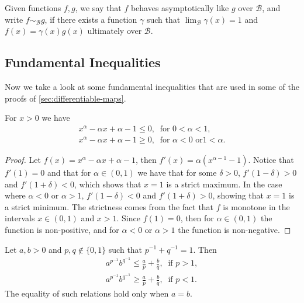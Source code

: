 \begin{definition}
Given functions \(f, g\), we say that \(f\) behaves asymptotically like \(g\)
over \(\mathcal B\), and write \(f \sim_{\mathcal B} g\), if there exists a
function \(\gamma\) such that \(\lim_{\mathcal B} \gamma(x) = 1\) and \(f(x) =
\gamma(x) g(x)\) ultimately over \(\mathcal B\).
\end{definition}

\subsection{Fundamental Inequalities}

Now we take a look at some fundamental inequalities that are used in some of the
proofs of \cref{sec:differentiable-maps}.

\begin{lemma}\label{lem: CI}
For \(x > 0\) we have
\begin{gather}
\label{eq: CI-1}
x^\alpha - \alpha x + \alpha - 1 \leq 0,\ \text{ for } 0 < \alpha < 1, \\
\label{eq: CI-2}
x^\alpha - \alpha x + \alpha - 1 \geq 0,\ \text{ for } \alpha < 0 \text{ or
} 1 < \alpha.
\end{gather}
\end{lemma}

\begin{proof}
Let \(f(x) = x^\alpha - \alpha x + \alpha - 1\), then \(f'(x) =
\alpha(x^{\alpha - 1} - 1)\). Notice that \(f'(1) = 0\) and that for \(\alpha
\in (0, 1)\) we have that for some \(\delta > 0\), \(f'(1 - \delta) > 0\) and
\(f'(1 + \delta) < 0\), which shows that \(x = 1\) is a strict maximum. In the
case where \(\alpha < 0\) or \(\alpha > 1\), \(f'(1 - \delta) < 0\) and \(f'(1
+ \delta) > 0\), showing that \(x = 1\) is a strict minimum. The strictness
comes from the fact that \(f\) is monotone in the intervals \(x \in (0, 1)\)
and \(x > 1\). Since \(f(1) = 0\), then for \(\alpha \in (0, 1)\) the function
is non-positive, and for \(\alpha < 0\) or \(\alpha > 1\) the function is
non-negative.
\end{proof}

\begin{proposition}\label{prop: young-ineq}
Let \(a, b >0\) and \(p, q \not\in \{0, 1\}\) such that \(p^{-1} + q^{-1} =
1\). Then
\begin{gather}
\label{eq: young-1}
a^{p^{-1}} b^{q^{-1}} \leq \frac a p  + \frac b q,\ \text{ if } p > 1,
\\
\label{eq: young-2}
a^{p^{-1}} b^{q^{-1}} \geq \frac a p  + \frac b q,\ \text{ if } p < 1.
\end{gather}
The equality of such relations hold only when \(a = b\).
\end{proposition}


